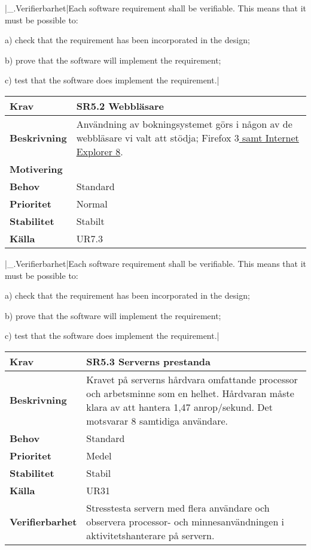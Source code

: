 \documentclass[a4paper, twoside, 11pt, titlepage]{article}
\begin{document}
|\_.Verifierbarhet|Each software requirement shall be verifiable. This means that it must be possible to:

a) check that the requirement has been incorporated in the design;

b) prove that the software will implement the requirement;

c) test that the software does implement the requirement.|

\begin{tabular} { p{2.6cm} p{12.5cm} }
	\hline
	\sffamily\textbf{Krav} & \sffamily\textbf{SR5.2 Webbläsare } \\
	\hline
	\sffamily\textbf{Beskrivning} & Användning av bokningsystemet görs i någon av de webbläsare vi valt att stödja; Firefox 3\underline{ samt Internet Explorer 8}.  \\
	\hline
	\sffamily\textbf{Motivering} &   \\
	\hline
	\sffamily\textbf{Behov} & Standard  \\
	\hline
	\sffamily\textbf{Prioritet} & Normal  \\
	\hline
	\sffamily\textbf{Stabilitet} & Stabilt  \\
	\hline
	\sffamily\textbf{Källa} & UR7.3  \\
	\hline
\end{tabular}
\vspace{6mm}

|\_.Verifierbarhet|Each software requirement shall be verifiable. This means that it must be possible to:

a) check that the requirement has been incorporated in the design;

b) prove that the software will implement the requirement;

c) test that the software does implement the requirement.|

\begin{tabular} { p{2.6cm} p{12.5cm} }
	\hline
	\sffamily\textbf{Krav} & \sffamily\textbf{SR5.3 Serverns prestanda } \\
	\hline
	\sffamily\textbf{Beskrivning} & Kravet på serverns hårdvara omfattande processor och arbetsminne som en helhet. Hårdvaran måste klara av att hantera 1,47 anrop/sekund. Det motsvarar 8 samtidiga användare.  \\
	\hline
	\sffamily\textbf{Behov} & Standard  \\
	\hline
	\sffamily\textbf{Prioritet} & Medel  \\
	\hline
	\sffamily\textbf{Stabilitet} & Stabil  \\
	\hline
	\sffamily\textbf{Källa} & UR31  \\
	\hline
	\sffamily\textbf{Verifierbarhet} & Stresstesta servern med flera användare och observera processor- och minnesanvändningen i aktivitetshanterare på servern.  \\
	\hline
\end{tabular}
\vspace{6mm}
\end{document}
